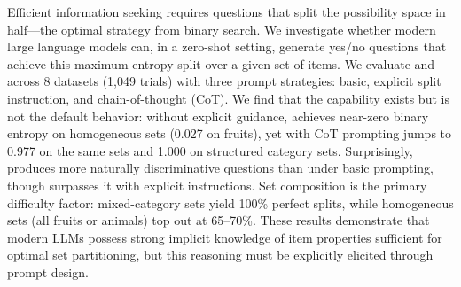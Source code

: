 Efficient information seeking requires questions that split the possibility space in half---the optimal strategy from binary search.
We investigate whether modern large language models can, in a zero-shot setting, generate yes/no questions that achieve this maximum-entropy split over a given set of items.
We evaluate \gptfull and \gptmini across 8 datasets (1,049 trials) with three prompt strategies: basic, explicit split instruction, and chain-of-thought (CoT).
We find that the capability exists but is not the default behavior: without explicit guidance, \gptfull achieves near-zero binary entropy on homogeneous sets (0.027 on fruits), yet with CoT prompting jumps to 0.977 on the same sets and 1.000 on structured category sets.
Surprisingly, \gptmini produces more naturally discriminative questions than \gptfull under basic prompting, though \gptfull surpasses it with explicit instructions.
Set composition is the primary difficulty factor: mixed-category sets yield 100\% perfect splits, while homogeneous sets (all fruits or animals) top out at 65--70\%.
These results demonstrate that modern LLMs possess strong implicit knowledge of item properties sufficient for optimal set partitioning, but this reasoning must be explicitly elicited through prompt design.
